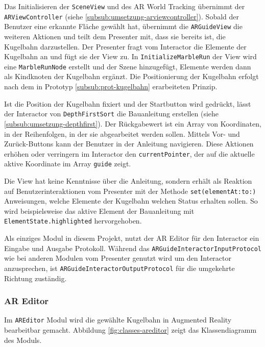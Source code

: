 Das Initialisieren der \texttt{SceneView} und des AR World Tracking übernimmt der \texttt{ARViewController} (siehe \ref{subsub:umsetzung-arviewcontroller}).
Sobald der Benutzer eine erkannte Fläche gewählt hat, übernimmt die \texttt{ARGuideView} die weiteren Aktionen und teilt dem Presenter mit, dass sie bereits ist, die Kugelbahn darzustellen.
Der Presenter fragt vom Interactor die Elemente der Kugelbahn an und fügt sie der View zu.
In \texttt{InitializeMarbleRun} der View wird eine \texttt{MarbleRunNode} erstellt und der Szene hinzugefügt, Elemente werden dann als Kindknoten der Kugelbahn ergänzt.
Die Positionierung der Kugelbahn erfolgt nach dem in Prototyp \ref{subsub:prot-kugelbahn} erarbeiteten Prinzip.

Ist die Position der Kugelbahn fixiert und der Startbutton wird gedrückt, lässt der Interactor von \texttt{DepthFirstSort} die Bauanleitung erstellen (siehe \ref{subsub:umsetzung-depthfirst}).
Der Rückgabewert ist ein Array von Koordinaten, in der Reihenfolgen, in der sie abgearbeitet werden sollen.
Mittels Vor- und Zurück-Buttons kann der Benutzer in der Anleitung navigieren.
Diese Aktionen erhöhen oder verringern im Interactor den \texttt{currentPointer}, der auf die aktuelle aktive Koordinate im Array \texttt{guide} zeigt.

Die View hat keine Kenntnisse über die Anleitung, sondern erhält als Reaktion auf Benutzerinteraktionen vom Presenter mit der Methode \texttt{set(elementAt:to:)} Anweisungen, welche Elemente der Kugelbahn welchen Status erhalten sollen.
So wird beispielsweise das aktive Element der Bauanleitung mit \texttt{ElementState.highlighted} hervorgehoben.

Als einziges Modul in diesem Projekt, nutzt der AR Editor für den Interactor ein Eingabe und Ausgabe Protokoll.
Während das \texttt{ARGuideInteractorInputProtocol} wie bei anderen Modulen vom Presenter genutzt wird um den Interactor anzusprechen, ist \texttt{ARGuideInteractorOutputProtocol} für die umgekehrte Richtung zuständig.


\subsubsection{AR Editor} \label{subsub:umsetzung-modul-areditor}

Im \texttt{AREditor} Modul wird die gewählte Kugelbahn in Augmented Reality bearbeitbar gemacht.
Abbildung \ref{fig:classes-areditor} zeigt das Klassendiagramm des Moduls.

